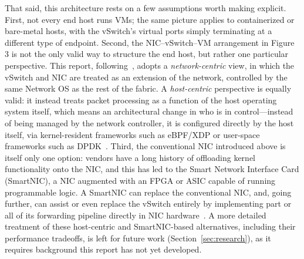 That said, this architecture rests on a few assumptions worth making explicit. First, not every end host runs VMs; the same picture applies to containerized or bare-metal hosts, with the vSwitch's virtual ports simply terminating at a different type of endpoint. Second, the NIC--vSwitch--VM arrangement in Figure 3 is not the only valid way to structure the end host, but rather one particular perspective. This report, following~\cite{systemsapproach}, adopts a \textit{network-centric} view, in which the vSwitch and NIC are treated as an extension of the network, controlled by the same Network OS as the rest of the fabric. A \textit{host-centric} perspective is equally valid: it instead treats packet processing as a function of the host operating system itself, which means an architectural change in who is in control---instead of being managed by the network controller, it is configured directly by the host itself, via kernel-resident frameworks such as eBPF/XDP or user-space frameworks such as DPDK~\cite{systemsapproach}. Third, the conventional NIC introduced above is itself only one option: vendors have a long history of offloading kernel functionality onto the NIC, and this has led to the Smart Network Interface Card (SmartNIC), a NIC augmented with an FPGA or ASIC capable of running programmable logic. A SmartNIC can replace the conventional NIC, and, going further, can assist or even replace the vSwitch entirely by implementing part or all of its forwarding pipeline directly in NIC hardware~\cite{systemsapproach}. A more detailed treatment of these host-centric and SmartNIC-based alternatives, including their performance tradeoffs, is left for future work (Section~\ref{sec:research}), as it requires background this report has not yet developed.
